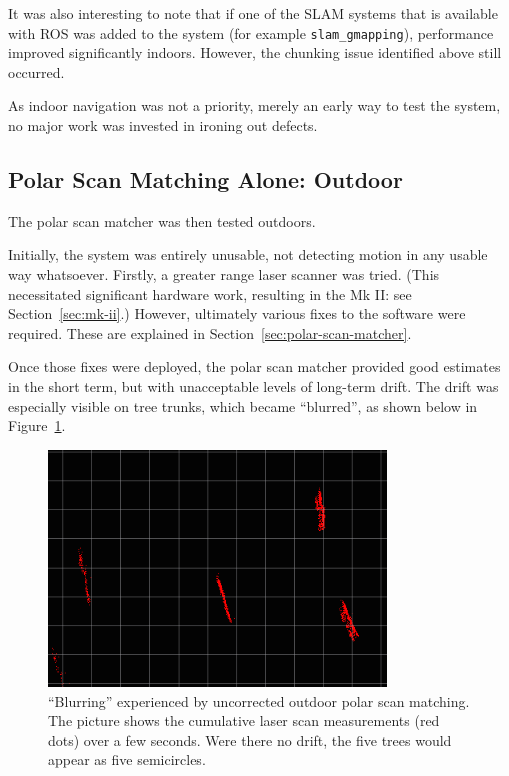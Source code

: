 \documentclass[12pt,oneside,a4paper]{book}
\begin{document}
It was also interesting to note that if one of the SLAM systems that
is available with ROS was added to the system (for example
\texttt{slam\_gmapping}), performance improved significantly
indoors. However, the chunking issue identified above still occurred.

As indoor navigation was not a priority, merely an early way to test
the system, no major work was invested in ironing out defects. 
\newpage
\subsection{Polar Scan Matching Alone: Outdoor}
\label{sec:psm-outdoor}

The polar scan matcher was then tested outdoors.

Initially, the system was entirely unusable, not detecting motion in
any usable way whatsoever. Firstly, a greater range laser scanner was
tried. (This necessitated significant hardware work, resulting in the
Mk II: see Section~\ref{sec:mk-ii}.) However, ultimately various fixes
to the software were required. These are explained in
Section~\ref{sec:polar-scan-matcher}.

Once those fixes were deployed, the polar scan matcher provided good
estimates in the short term, but with unacceptable levels of long-term
drift. The drift was especially visible on tree trunks, which became
``blurred'', as shown below in Figure~\ref{fig:blur-detailed}.

\begin{figure}[h!]
  \centering
  \includegraphics[width=0.8\textwidth]{figs/blurring}
  \caption{``Blurring'' experienced by uncorrected outdoor polar scan
    matching. The picture shows the cumulative laser scan measurements
  (red dots) over a few seconds. Were there no drift, the five trees would
  appear as five semicircles.}
  \label{fig:blur-detailed}
\end{figure}
\end{document}

